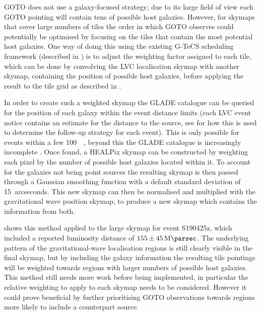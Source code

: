 \begin{colsection}
\begin{colsection}
GOTO does not use a galaxy-focused strategy; due to its large field of view each GOTO pointing will contain tens of possible host galaxies. However, for skymaps that cover large numbers of tiles the order in which GOTO observes could potentially be optimised by focusing on the tiles that contain the most potential host galaxies. One way of doing this using the existing G-TeCS scheduling framework (described in ) is to adjust the weighting factor assigned to each tile, which can be done by convolving the LVC localisation skymap with another skymap, containing the position of possible host galaxies, before applying the result to the tile grid as described in .

In order to create such a weighted skymap the GLADE catalogue can be queried for the position of each galaxy within the event distance limits (each LVC event notice contains an estimate for the distance to the source, see  for how this is used to determine the follow-up strategy for each event). This is only possible for events within a few \SI{100}{\mega\parsec}, beyond this the GLADE catalogue is increasingly incomplete \citep{GLADE}. Once found, a HEALPix skymap can be constructed by weighting each pixel by the number of possible host galaxies located within it. To account for the galaxies not being point sources the resulting skymap is then passed through a Gaussian smoothing function with a default standard deviation of 15~arcseconds. This new skymap can then be normalised and multiplied with the gravitational wave position skymap, to produce a new skymap which contains the information from both.

 shows this method applied to the large skymap for event S190425z, which included a reported luminosity distance of $155\pm\SI{45}{\mega\parsec}$. The underlying pattern of the gravitational-wave localisation regions is still clearly visible in the final skymap, but by including the galaxy information the resulting tile pointings will be weighted towards regions with larger numbers of possible host galaxies. This method still needs more work before being implemented, in particular the relative weighting to apply to each skymap needs to be considered. However it could prove beneficial by further prioritising GOTO observations towards regions more likely to include a counterpart source.


\end{colsection}
\end{colsection}
